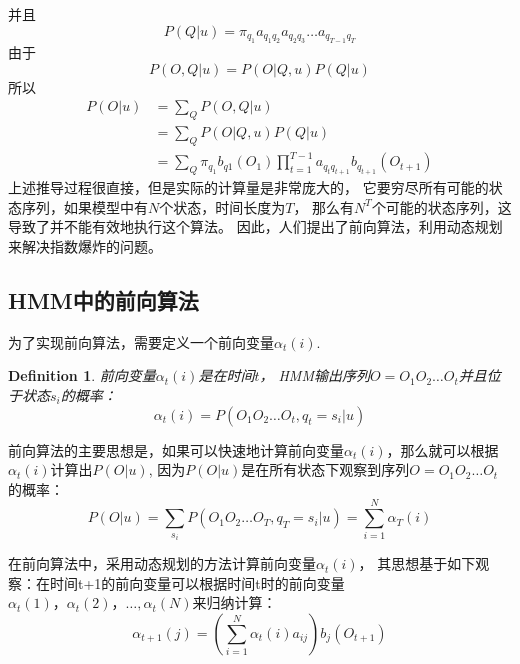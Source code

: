 \documentclass[a4paper,12pt]{book}
\newtheorem{definition}{Definition}
\begin{document}
    并且
    \begin{equation}
        P(Q|u) = \pi _{q_1}a_{q_1q_2}a_{q_2q_3} \dots a_{q_{T-1}q_T}
    \end{equation}
    由于
    \begin{equation}
        P(O,Q|u) = P(O|Q,u)P(Q|u)
    \end{equation}
    所以
    \begin{equation}
        \begin{split}
            P(O|u) &= \sum _{Q} P(O,Q|u) \\
            &=\sum _{Q}P(O|Q,u)P(Q|u) \\
            &=\sum _{Q}\pi _{q_1}b_{q1}(O_1)\prod_{t=1}^{T-1}a_{q_{t}q_{t+1}}b_{q_{t+1}}(O_{t+1})
        \end{split}
    \end{equation}
    上述推导过程很直接，但是实际的计算量是非常庞大的，
    它要穷尽所有可能的状态序列，如果模型中有$N$个状态，时间长度为$T$，
    那么有$N^T$个可能的状态序列，这导致了并不能有效地执行这个算法。
    因此，人们提出了前向算法，利用动态规划来解决指数爆炸的问题。

    \subsection{HMM中的前向算法}

    为了实现前向算法，需要定义一个前向变量$\alpha_t(i)$.

    
    \begin{definition}
        前向变量$\alpha_t(i)$是在时间$t$， HMM输出序列$O=O_1O_2\dots O_t$并且位于状态$s_i$的概率：
        \begin{equation}
            \alpha_t(i) = P(O_1O_2\dots O_t, q_t=s_i|u)
        \end{equation}
    \end{definition} 
    

    前向算法的主要思想是，如果可以快速地计算前向变量$\alpha_t(i)$，那么就可以根据$\alpha_t(i)$计算出$P(O|u) $, 因为$P(O|u) $是在所有状态下观察到序列$O=O_1O_2\dots O_t$的概率：
    \begin{equation}
        P(O|u) = \sum _{s_i}P(O_1O_2\dots O_T, q_T=s_i|u)= \sum _{i=1}^{N}\alpha_T(i)
    \end{equation}


    在前向算法中，采用动态规划的方法计算前向变量$\alpha_t(i)$，
    其思想基于如下观察：在时间t+1的前向变量可以根据时间t时的前向变量$\alpha_t(1)，\alpha_t(2)，\dots, \alpha_t(N)$来归纳计算：
    \begin{equation}
        \alpha_{t+1}(j) = (\sum_{i=1}^{N}\alpha_t(i)a_{ij})b_j({O_{t+1}}) 
    \end{equation}
\end{document}
